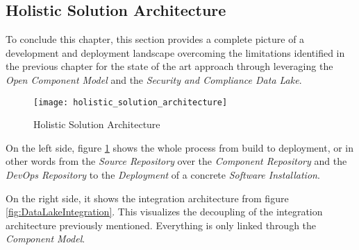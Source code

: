 \subsection{Holistic Solution Architecture}
To conclude this chapter, this section provides a complete picture of a development and deployment landscape overcoming the limitations identified in the previous chapter for the state of the art approach through leveraging the \emph{Open Component Model} and the \emph{Security and Compliance Data Lake}.

\begin{figure}[H]
	\centering
	\texttt{[image: holistic\_solution\_architecture]}
	\caption[Holistic Solution Architecture]{Holistic Solution Architecture }
	\label{fig:HolisticSolutionArchitecture}
\end{figure}

On the left side, figure \ref{fig:HolisticSolutionArchitecture} shows the whole process from build to deployment, or in other words from the \emph{Source Repository} over the \emph{Component Repository} and the \emph{DevOps Repository} to the \emph{Deployment} of a concrete \emph{Software Installation}.\par
On the right side, it shows the integration architecture from figure \ref{fig:DataLakeIntegration}. This visualizes the decoupling of the integration architecture previously mentioned. Everything is only linked through the \emph{Component Model}.\\

